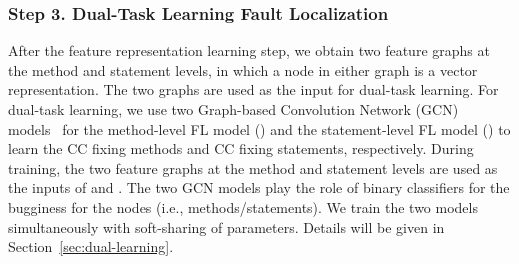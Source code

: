 



\subsubsection{{\bf Step 3. Dual-Task Learning Fault
Localization}}

After the feature representation learning step, we obtain two feature
graphs at the method and statement levels, in which a node in
either graph is a vector representation. The two graphs are used as
the input for dual-task learning. For dual-task learning, we use two
Graph-based Convolution Network (GCN) models~\cite{kipf2016semi} for
the method-level FL model () and the statement-level FL
model () to learn the CC fixing methods and CC fixing
statements, respectively. During training, the two feature graphs at
the method and statement levels are used as the inputs of
 and .
The two GCN models play the role of binary classifiers for the
bugginess for the nodes (i.e., methods/statements). We train the two
models simultaneously with soft-sharing of parameters. Details will
be given in Section~\ref{sec:dual-learning}.


